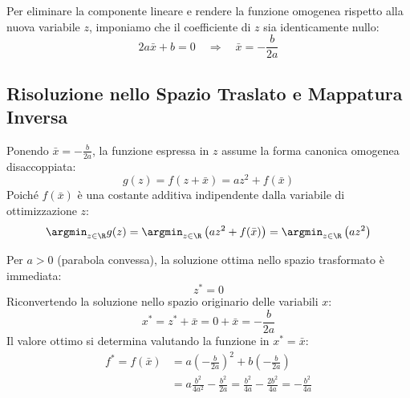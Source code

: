 Per eliminare la componente lineare e rendere la funzione omogenea rispetto alla nuova variabile $z$, imponiamo che il coefficiente di $z$ sia identicamente nullo:
\begin{equation}
2a\bar{x} + b = 0 \quad \Longrightarrow \quad \bar{x} = -\frac{b}{2a}
\end{equation}

\subsection{Risoluzione nello Spazio Traslato e Mappatura Inversa}
Ponendo $\bar{x} = -\frac{b}{2a}$, la funzione espressa in $z$ assume la forma canonica omogenea disaccoppiata:
\begin{equation}
g(z) = f(z + \bar{x}) = az^2 + f(\bar{x})
\end{equation}
Poich\'e $f(\bar{x})$ \`e una costante additiva indipendente dalla variabile di ottimizzazione $z$:
\begin{equation}
\argmin_{z \in \R} g(z) = \argmin_{z \in \R} \left( az^2 + f(\bar{x}) \right) = \argmin_{z \in \R} \left( az^2 \right)
\end{equation}

Per $a > 0$ (parabola convessa), la soluzione ottima nello spazio trasformato \`e immediata:
\begin{equation}
z^* = 0
\end{equation}
Riconvertendo la soluzione nello spazio originario delle variabili $x$:
\begin{equation}
x^* = z^* + \bar{x} = 0 + \bar{x} = -\frac{b}{2a}
\end{equation}
Il valore ottimo si determina valutando la funzione in $x^* = \bar{x}$:
\begin{align}
f^* = f(\bar{x}) &= a\left(-\frac{b}{2a}\right)^2 + b\left(-\frac{b}{2a}\right) \nonumber\\
&= a\frac{b^2}{4a^2} - \frac{b^2}{2a} = \frac{b^2}{4a} - \frac{2b^2}{4a} = -\frac{b^2}{4a}
\end{align}

